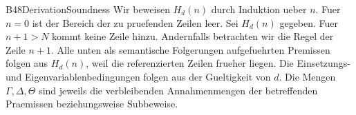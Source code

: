 {B48DerivationSoundness}{
}
Wir beweisen \(H_d(n)\) durch Induktion ueber \(n\).
Fuer \(n=0\) ist der Bereich der zu pruefenden Zeilen leer.
Sei \(H_d(n)\) gegeben. Fuer \(n+1>N\) kommt keine Zeile hinzu.
Andernfalls betrachten wir die Regel der Zeile \(n+1\).
Alle unten als semantische Folgerungen aufgefuehrten Premissen
folgen aus \(H_d(n)\), weil die referenzierten Zeilen frueher
liegen. Die Einsetzungs- und Eigenvariablenbedingungen folgen
aus der Gueltigkeit von \(d\). Die Mengen
\(\Gamma,\Delta,\Theta\) sind jeweils die verbleibenden
Annahmenmengen der betreffenden Praemissen beziehungsweise
Subbeweise.

